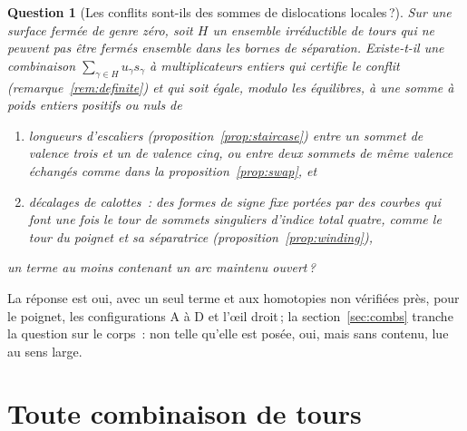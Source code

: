 \documentclass[11pt,a4paper]{article}
\newtheorem{question}{Question}
\newcommand{\shift}{s}
\begin{document}
\begin{question}[Les conflits sont-ils des sommes de dislocations locales\,?]\label{conj:local}
Sur une surface fermée de genre zéro, soit $H$ un ensemble irréductible de
tours qui ne peuvent pas être fermés ensemble dans les bornes de séparation.
Existe-t-il une combinaison $\sum_{\gamma \in H} u_\gamma \shift_\gamma$ à
multiplicateurs entiers qui certifie le conflit (remarque~\ref{rem:definite})
et qui soit égale, modulo les équilibres, à une somme à poids entiers positifs
ou nuls de
\begin{enumerate}
\item[(i)] longueurs d'escaliers (proposition~\ref{prop:staircase}) entre un
  sommet de valence trois et un de valence cinq, ou entre deux sommets de même
  valence échangés comme dans la proposition~\ref{prop:swap}, et
\item[(ii)] décalages de calottes~: des formes de signe fixe portées par des
  courbes qui font une fois le tour de sommets singuliers d'indice total
  quatre, comme le tour du poignet et sa séparatrice
  (proposition~\ref{prop:winding}),
\end{enumerate}
un terme au moins contenant un arc maintenu ouvert\,?
\end{question}

La réponse est oui, avec un seul terme et aux homotopies non vérifiées près,
pour le poignet, les configurations A à D et l'œil droit\,; la
section~\ref{sec:combs} tranche la question sur le corps~: non telle qu'elle
est posée, oui, mais sans contenu, lue au sens large.

\section{Toute combinaison de tours}\label{sec:fox}
\end{document}
